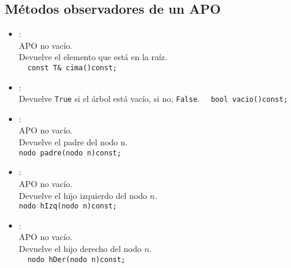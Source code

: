 \subsection*{Métodos observadores de un APO}
\begin{itemize}
  \item {}:\\
   APO no vacío.\\
   Devuelve el elemento que está en la raíz.\\
  \verb|  const T& cima()const;|
  \item {}:\\
   Devuelve \texttt{True} si el árbol está vacío, si no, \texttt{False}.
  \verb|  bool vacio()const;|
  \item {}:\\
   APO no vacío.\\
   Devuelve el padre del nodo n.\\
  \verb|nodo padre(nodo n)const;|
  \item {}:\\
   APO no vacío.\\
   Devuelve el hijo izquierdo del nodo \(n\).\\
  \verb|nodo hIzq(nodo n)const;|
  \item {}:\\
   APO no vacío.\\
   Devuelve el hijo derecho del nodo \(n\).\\
  \verb|  nodo hDer(nodo n)const;|
\end{itemize}


